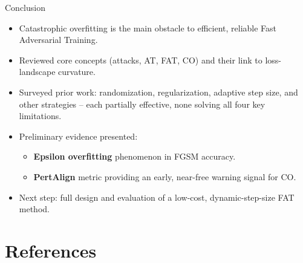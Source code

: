 \documentclass[11pt,aspectratio=169]{beamer}
\begin{document}
\begin{frame}{Conclusion}
  \begin{itemize}
    \item Catastrophic overfitting is the main obstacle to efficient, reliable Fast Adversarial Training.
    \item Reviewed core concepts (attacks, AT, FAT, CO) and their link to loss-landscape curvature.
    \item Surveyed prior work: randomization, regularization, adaptive step size, and other strategies -- each partially effective, none solving all four key limitations.
    \item Preliminary evidence presented:
    \begin{itemize}
      \item \textbf{Epsilon overfitting} phenomenon in FGSM accuracy.
      \item \textbf{PertAlign} metric providing an early, near-free warning signal for CO.
    \end{itemize}
    \item Next step: full design and evaluation of a low-cost, dynamic-step-size FAT method.
  \end{itemize}
\end{frame}

\section{References}
\end{document}
